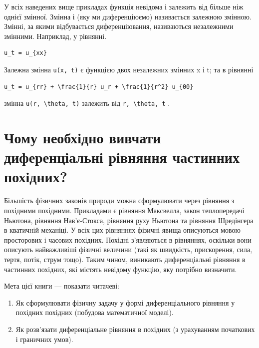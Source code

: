 \documentclass[
  ukrainian,
]{article}
\begin{document}
У всіх наведених вище прикладах функція невідома і залежить від більше
ніж однієї змінної. Змінна і (яку ми диференціюємо) називається залежною
змінною. Змінні, за якими відбувається диференціювання, називаються
незалежними змінними. Наприклад, у рівнянні.

\begin{verbatim}
u_t = u_{xx}
\end{verbatim}

Залежна змінна \texttt{u(x,\ t)} є функцією двох незалежних змінних x і
t; та в рівнянні

\begin{verbatim}
u_t = u_{rr} + \frac{1}{r} u_r + \frac{1}{r^2} u_{00}
\end{verbatim}

змінна \texttt{u(r,\ \textbackslash{}theta,\ t)} залежить від
\texttt{r,\ \textbackslash{}theta,\ t} .

\section{Чому необхідно вивчати диференціальні рівняння частинних
похідних?}\label{ux447ux43eux43cux443-ux43dux435ux43eux431ux445ux456ux434ux43dux43e-ux432ux438ux432ux447ux430ux442ux438-ux434ux438ux444ux435ux440ux435ux43dux446ux456ux430ux43bux44cux43dux456-ux440ux456ux432ux43dux44fux43dux43dux44f-ux447ux430ux441ux442ux438ux43dux43dux438ux445-ux43fux43eux445ux456ux434ux43dux438ux445}

Більшість фізичних законів природи можна сформулювати через рівняння з
похідними похідними. Прикладами є рівняння Максвелла, закон
теплопередачі Ньютона, рівняння Нав'є-Стокса, рівняння руху Ньютона та
рівняння Шредінгера в кватичній механіці. У всіх цих рівняннях фізичні
явища описуються мовою просторових і часових похідних. Похідні
з'являються в рівняннях, оскільки вони описують найважливіші фізичні
величини (такі як швидкість, прискорення, сила, тертя, потік, струм
тощо). Таким чином, виникають диференціальні рівняння в частинних
похідних, які містять невідому функцію, яку потрібно визначити.

Мета цієї книги --- показати читачеві:

\begin{enumerate}
\def\labelenumi{\arabic{enumi}.}
\item
  Як сформулювати фізичну задачу у формі диференціального рівняння у
  похідних похідних (побудова математичної моделі).
\item
  Як розв'язати диференціальне рівняння в похідних (з урахуванням
  початкових і граничних умов).
\end{enumerate}
\end{document}
